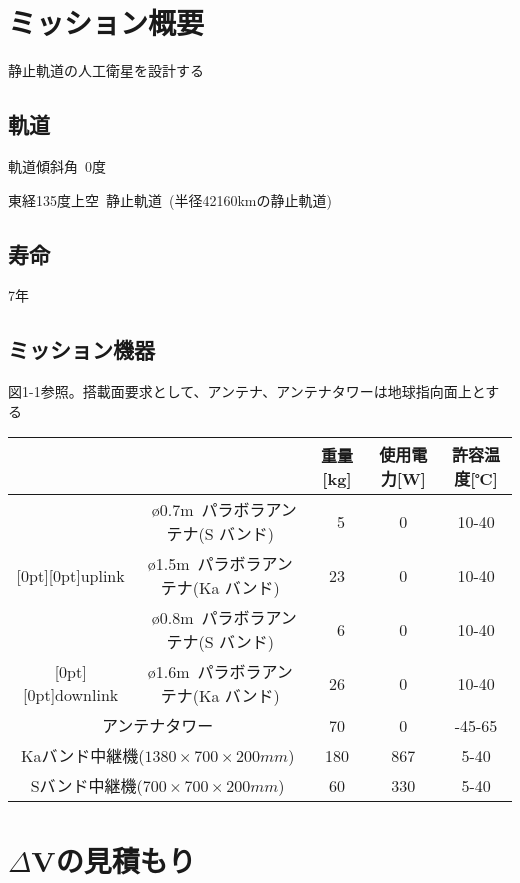\documentclass[15pt,uplatex,dvipdfmx]{jsarticle}
\begin{document}
\setcounter{section}{-1}

\section{ミッション概要}
静止軌道の人工衛星を設計する

\subsection{軌道}
軌道傾斜角\ 0度 \par
東経135度上空\ 静止軌道\ (半径42160kmの静止軌道)

\subsection{寿命}
7年

\subsection{ミッション機器}
図1-1参照。搭載面要求として、アンテナ、アンテナタワーは地球指向面上とする\par\medskip
\begin{tabular}{|c|c|c|c|c|} \hline
  \multicolumn{2}{|c|}{} & 重量[kg] & 使用電力[W] & 許容温度[℃] \\ \hline
   & \o0.7m\ パラボラアンテナ(S バンド) & 5 & 0 & 10-40 \\ \cline{2-5}
   \raisebox{.5\normalbaselineskip}[0pt][0pt]{uplink}
   & \o1.5m\ パラボラアンテナ(Ka バンド) & 23 & 0 & 10-40 \\ \hline
   & \o0.8m\ パラボラアンテナ(S バンド) & 6 & 0 & 10-40 \\ \cline{2-5}
   \raisebox{.5\normalbaselineskip}[0pt][0pt]{downlink}
   & \o1.6m\ パラボラアンテナ(Ka バンド) & 26 & 0 & 10-40 \\ \hline
   \multicolumn{2}{|c|}{アンテナタワー} & 70 & 0 & -45-65 \\ \hline
   \multicolumn{2}{|c|}{Kaバンド中継機($1380\times700\times200mm$)} & 180 & 867 & 5-40 \\ \hline
   \multicolumn{2}{|c|}{Sバンド中継機($700\times700\times200mm$)} & 60 & 330 & 5-40 \\ \hline
\end{tabular}\par\medskip


\section{$\Delta$Vの見積もり}
\end{document}
